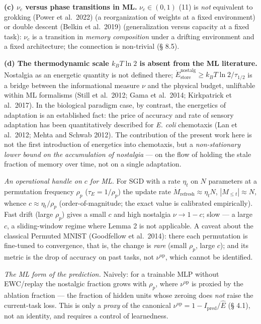 \documentclass[pdflatex,sn-mathphys-ay]{sn-jnl}
\begin{document}
\textbf{(c) \(\nu_c\) versus phase transitions in ML.} \(\nu_c \in (0,1)\) (11) is \emph{not} equivalent to grokking (Power et al.~2022) (a reorganization of weights at a fixed environment) or double descent (Belkin et al.~2019) (generalization versus capacity at a fixed task): \(\nu_c\) is a transition in \emph{memory composition} under a drifting environment and a fixed architecture; the connection is non-trivial (§ 8.5).



\textbf{(d) The thermodynamic scale \(k_B T \ln 2\) is absent from the ML literature.} Nostalgia as an energetic quantity is not defined there; \(\dot{E}_{\text{store}}^{\text{nostalg}} \ge k_B T \ln 2 / \tau_{1/2}\) is a bridge between the informational measure \(\nu\) and the physical budget, unliftable within ML formalisms (Still et al.~2012; Gama et al.~2014; Kirkpatrick et al.~2017). In the biological paradigm case, by contrast, the energetics of adaptation is an established fact: the price of accuracy and rate of sensory adaptation has been quantitatively described for \emph{E. coli} chemotaxis (Lan et al.~2012; Mehta and Schwab 2012). The contribution of the present work here is not the first introduction of energetics into chemotaxis, but a \emph{non-stationary lower bound on the accumulation of nostalgia} --- on the flow of holding the stale fraction of memory over time, not on a single adaptation.



\emph{An operational handle on \(c\) for ML.} For SGD with a rate \(\eta_t\) on \(N\) parameters at a permutation frequency \(\rho_p\) (\(\tau_E = 1/\rho_p\)) the update rate \(\dot M_{\text{refresh}} \approx \eta_t N\), \(|M_{\le t}| \approx N\), whence \(c \approx \eta_t/\rho_p\) (order-of-magnitude; the exact value is calibrated empirically). Fast drift (large \(\rho_p\)) gives a small \(c\) and high nostalgia \(\nu \to 1-c\); slow --- a large \(c\), a sliding-window regime where Lemma 2 is not applicable. A caveat about the classical Permuted MNIST (Goodfellow et al.~2014): there each permutation is fine-tuned to convergence, that is, the change is \emph{rare} (small \(\rho_p\), large \(c\)); and its metric is the drop of accuracy on past tasks, not \(\nu^{\text{op}}\), which cannot be identified.



\emph{The ML form of the prediction.} Naively: for a trainable MLP without EWC/replay the nostalgic fraction grows with \(\rho_p\), where \(\nu^{\text{op}}\) is proxied by the ablation fraction --- the fraction of hidden units whose zeroing does \emph{not} raise the current-task loss. This is only a \emph{proxy} of the canonical \(\nu^{\text{op}} = 1 - I_{\text{pred}}/\hat E\) (§ 4.1), not an identity, and requires a control of learnedness.
\end{document}
